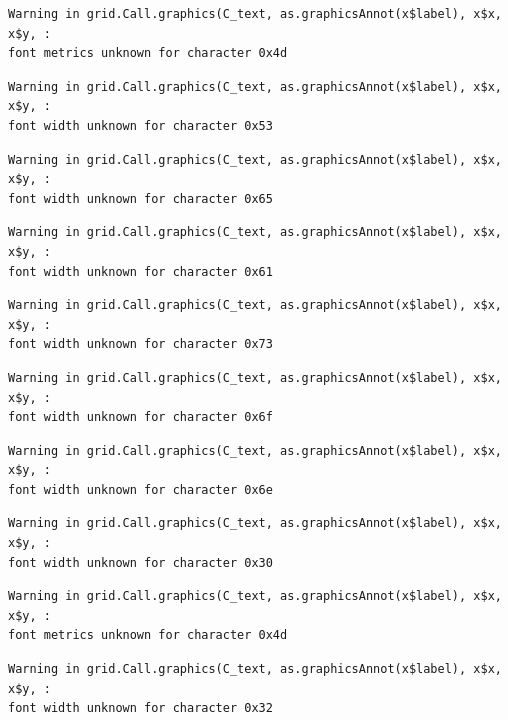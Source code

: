 \documentclass[
  letterpaper,
  DIV=11,
  numbers=noendperiod]{scrreprt}
\begin{document}
\begin{verbatim}
Warning in grid.Call.graphics(C_text, as.graphicsAnnot(x$label), x$x, x$y, :
font metrics unknown for character 0x4d
\end{verbatim}

\begin{verbatim}
Warning in grid.Call.graphics(C_text, as.graphicsAnnot(x$label), x$x, x$y, :
font width unknown for character 0x53
\end{verbatim}

\begin{verbatim}
Warning in grid.Call.graphics(C_text, as.graphicsAnnot(x$label), x$x, x$y, :
font width unknown for character 0x65
\end{verbatim}

\begin{verbatim}
Warning in grid.Call.graphics(C_text, as.graphicsAnnot(x$label), x$x, x$y, :
font width unknown for character 0x61
\end{verbatim}

\begin{verbatim}
Warning in grid.Call.graphics(C_text, as.graphicsAnnot(x$label), x$x, x$y, :
font width unknown for character 0x73
\end{verbatim}

\begin{verbatim}
Warning in grid.Call.graphics(C_text, as.graphicsAnnot(x$label), x$x, x$y, :
font width unknown for character 0x6f
\end{verbatim}

\begin{verbatim}
Warning in grid.Call.graphics(C_text, as.graphicsAnnot(x$label), x$x, x$y, :
font width unknown for character 0x6e
\end{verbatim}

\begin{verbatim}
Warning in grid.Call.graphics(C_text, as.graphicsAnnot(x$label), x$x, x$y, :
font width unknown for character 0x30
\end{verbatim}

\begin{verbatim}
Warning in grid.Call.graphics(C_text, as.graphicsAnnot(x$label), x$x, x$y, :
font metrics unknown for character 0x4d
\end{verbatim}

\begin{verbatim}
Warning in grid.Call.graphics(C_text, as.graphicsAnnot(x$label), x$x, x$y, :
font width unknown for character 0x32
\end{verbatim}
\end{document}
